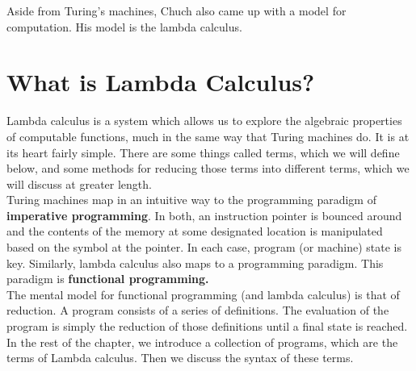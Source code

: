 Aside from Turing's machines, Chuch also came up with a model for computation. His model is the lambda calculus.\\


\section{What is Lambda Calculus?}
Lambda calculus is a system which allows us to explore the algebraic properties of computable functions, much in the same way that Turing machines do. It is at its heart fairly simple. There are some things called terms, which we will define below, and some methods for reducing those terms into different terms, which we will discuss at greater length.\\

Turing machines map in an intuitive way to the programming paradigm of \textbf{imperative programming}. In both, an instruction pointer is bounced around and the contents of the memory at some designated location is manipulated based on the symbol at the pointer. In each case, program (or machine) state is key. Similarly, lambda calculus also maps to a programming paradigm. This paradigm is \textbf{functional programming.}\\

The mental model for functional programming (and lambda calculus) is that of reduction. A program consists of a series of definitions. The evaluation of the program is simply the reduction of those definitions until a final state is reached.\\

In the rest of the chapter, we introduce a collection of programs, which are the terms of Lambda calculus. Then we discuss the syntax of these terms.\\


